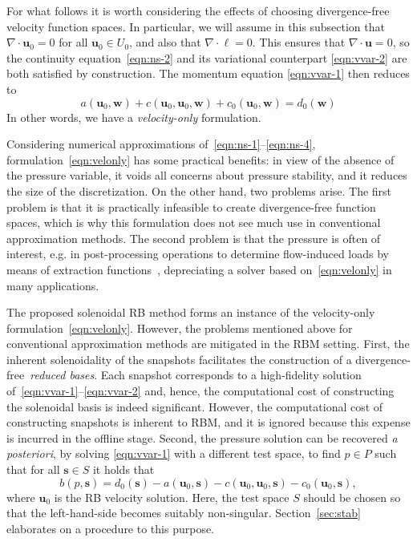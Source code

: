 \documentclass[onecolumn, twoside, a4paper, 11pt]{article}
\begin{document}
For what follows it is worth considering the effects of choosing divergence-free
velocity function spaces. In particular, we will assume in this subsection that
$\nabla \cdot \bm{u}_0 = 0$ for all $\bm{u}_0 \in U_0$, and also that
$\nabla \cdot \bm \ell = 0$. This ensures that $\nabla \cdot \bm u = 0$, so the
continuity equation~\eqref{eqn:ns-2} and its variational counterpart
\eqref{eqn:vvar-2} are both satisfied by construction. The momentum equation
\eqref{eqn:vvar-1} then reduces to
%
\begin{equation}
a(\bm u_0, \bm w) + c(\bm u_0, \bm u_0, \bm w) + c_0(\bm u_0, \bm w)
= d_0(\bm w)
\label{eqn:velonly}
\end{equation}
%
In other words, we have a \emph{velocity-only} formulation.

Considering numerical approximations of~\eqref{eqn:ns-1}--\eqref{eqn:ns-4},
formulation~\eqref{eqn:velonly} has some practical benefits: in view of the
absence of the pressure variable, it voids all concerns about
pressure stability, and it reduces the size of the discretization.
On the other hand, two problems arise. The first problem is that it is
practically infeasible to create divergence-free function spaces, which is
why this formulation does not see much use in conventional approximation methods.
The second problem is that the pressure
is often of interest, e.g. in post-processing operations to determine flow-induced loads by means
of extraction functions~\cite{Melbo2003goe,Brummelen2012fep}, depreciating a solver
based on~\eqref{eqn:velonly} in many applications.

The proposed solenoidal RB method forms an instance of the velocity-only formulation~\eqref{eqn:velonly}.
However, the problems mentioned above for conventional approximation methods are mitigated in the
RBM setting. First, the inherent solenoidality of the snapshots facilitates the construction of a
divergence-free~\emph{reduced bases}. Each snapshot corresponds to a high-fidelity solution
of~\eqref{eqn:vvar-1}--\eqref{eqn:vvar-2} and, hence, the computational cost of constructing the
solenoidal basis is indeed significant. However, the computational cost of constructing snapshots is
inherent to RBM, and it is ignored because this expense is incurred in the offline stage.  Second,
the pressure solution can be recovered \emph{a posteriori}, by solving \eqref{eqn:vvar-1} with a
different test space, to find $p\in P$ such that for all $\bm s \in S$ it holds that
%
\begin{equation}
  b(p, \bm s) = d_0(\bm s) - a(\bm u_0, \bm s) - c(\bm u_0, \bm u_0, \bm s) - c_0(\bm u_0, \bm s),
  \label{eqn:sup-vvar}
\end{equation}
where $\bm u_0$ is the RB velocity solution. Here, the test space $S$ should
be chosen so that the left-hand-side becomes suitably non-singular.
Section~\ref{sec:stab} elaborates on a procedure to this purpose.
\end{document}
